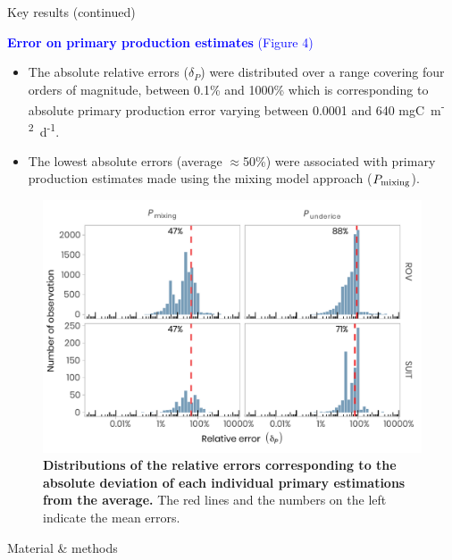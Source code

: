 \documentclass[final]{beamer}
\newlength{\colwidth}
\newcommand{\ppmixing}{\ensuremath{P_{\text{\scriptsize mixing}}}}
\newcommand{\dailypp}{mgC~m\textsuperscript{-2}~d\textsuperscript{-1}}
\begin{document}
\begin{frame}[t]
\begin{columns}[t]
\begin{column}{\colwidth}
			\begin{block}{Key results (continued)}

				\textcolor{blue}{\large \textbf{Error on primary production estimates} (Figure 4)}

				\begin{itemize}
					\justifying
					\setlength\itemsep{2.5em}
					\item The absolute relative errors ($\delta_P$) were distributed over a range covering four orders of magnitude, between 0.1\% and 1000\% which is corresponding to absolute primary production error varying between 0.0001 and 640 \dailypp{}.
					\item The lowest absolute errors (average $\approx$50\%) were associated with primary production estimates made using the mixing model approach (\ppmixing{}).
				\end{itemize}

				\vspace{-15mm}
				\begin{figure}
					\centering
					\includegraphics[scale = 1.75]{graphs/fig6.pdf}
					\caption{\textbf{Distributions of the relative errors corresponding to the absolute deviation of each individual primary estimations from the average.} The red lines and the numbers on the left indicate the mean errors.}
				\end{figure}

			\end{block}

			\vspace{-3.0cm}
			\begin{block}{\small Material \& methods}

				\footnotesize


\end{block}
\end{column}
\end{columns}
\end{frame}
\end{document}
